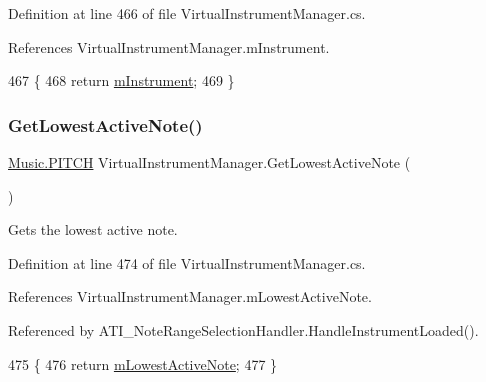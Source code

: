 Definition at line 466 of file Virtual\+Instrument\+Manager.\+cs.



References Virtual\+Instrument\+Manager.\+m\+Instrument.


\begin{DoxyCode}
467     \{
468         \textcolor{keywordflow}{return} \hyperlink{group___v_i_m_priv_gaed435d1f9be09864846db4322dc21fd1}{mInstrument};
469     \}
\end{DoxyCode}
\mbox{\label{group___v_i_m_pub_func_ga09bfbd0756fc8110c877e5b59c104bcd}} 
\subsubsection{\texorpdfstring{Get\+Lowest\+Active\+Note()}{GetLowestActiveNote()}}
{\footnotesize\ttfamily \hyperlink{group___music_enums_ga508f69b199ea518f935486c990edac1d}{Music.\+P\+I\+T\+CH} Virtual\+Instrument\+Manager.\+Get\+Lowest\+Active\+Note (\begin{DoxyParamCaption}{ }\end{DoxyParamCaption})}



Gets the lowest active note. 



Definition at line 474 of file Virtual\+Instrument\+Manager.\+cs.



References Virtual\+Instrument\+Manager.\+m\+Lowest\+Active\+Note.



Referenced by A\+T\+I\+\_\+\+Note\+Range\+Selection\+Handler.\+Handle\+Instrument\+Loaded().


\begin{DoxyCode}
475     \{
476         \textcolor{keywordflow}{return} \hyperlink{group___v_i_m_priv_ga5e3a5116e0dabb37e0ea21d73ac1567e}{mLowestActiveNote};
477     \}
\end{DoxyCode}
\mbox{\label{group___v_i_m_pub_func_gaeb152486450d6c6dc50078e1644c4c6a}} 
